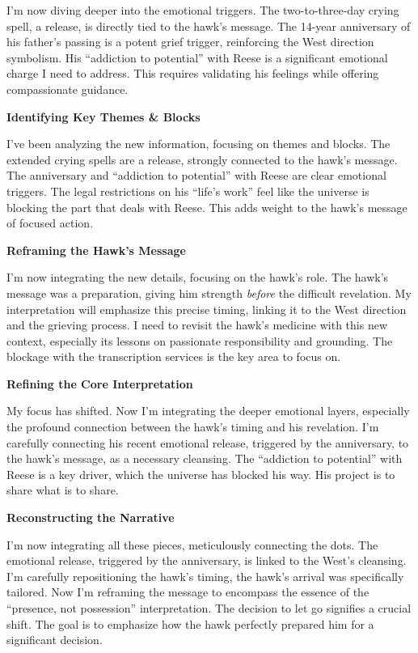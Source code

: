\documentclass{article}
\begin{document}
I'm now diving deeper into the emotional triggers. The two-to-three-day crying spell, a release, is directly tied to the hawk's message. The 14-year anniversary of his father's passing is a potent grief trigger, reinforcing the West direction symbolism. His ``addiction to potential'' with Reese is a significant emotional charge I need to address. This requires validating his feelings while offering compassionate guidance.

\textbf{Identifying Key Themes \& Blocks}

I've been analyzing the new information, focusing on themes and blocks. The extended crying spells are a release, strongly connected to the hawk's message. The anniversary and ``addiction to potential'' with Reese are clear emotional triggers. The legal restrictions on his ``life's work'' feel like the universe is blocking the part that deals with Reese. This adds weight to the hawk's message of focused action.

\textbf{Reframing the Hawk's Message}

I'm now integrating the new details, focusing on the hawk's role. The hawk's message was a preparation, giving him strength \emph{before} the difficult revelation. My interpretation will emphasize this precise timing, linking it to the West direction and the grieving process. I need to revisit the hawk's medicine with this new context, especially its lessons on passionate responsibility and grounding. The blockage with the transcription services is the key area to focus on.

\textbf{Refining the Core Interpretation}

My focus has shifted. Now I'm integrating the deeper emotional layers, especially the profound connection between the hawk's timing and his revelation. I'm carefully connecting his recent emotional release, triggered by the anniversary, to the hawk's message, as a necessary cleansing. The ``addiction to potential'' with Reese is a key driver, which the universe has blocked his way. His project is to share what is to share.

\textbf{Reconstructing the Narrative}

I'm now integrating all these pieces, meticulously connecting the dots. The emotional release, triggered by the anniversary, is linked to the West's cleansing. I'm carefully repositioning the hawk's timing, the hawk's arrival was specifically tailored. Now I'm reframing the message to encompass the essence of the ``presence, not possession'' interpretation. The decision to let go signifies a crucial shift. The goal is to emphasize how the hawk perfectly prepared him for a significant decision.
\end{document}

